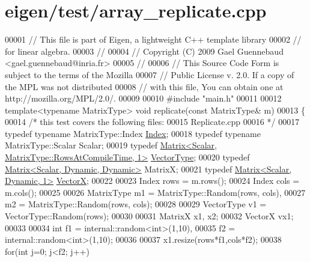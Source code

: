 \hypertarget{eigen_2test_2array__replicate_8cpp_source}{}\section{eigen/test/array\+\_\+replicate.cpp}
\label{eigen_2test_2array__replicate_8cpp_source}

\begin{DoxyCode}
00001 \textcolor{comment}{// This file is part of Eigen, a lightweight C++ template library}
00002 \textcolor{comment}{// for linear algebra.}
00003 \textcolor{comment}{//}
00004 \textcolor{comment}{// Copyright (C) 2009 Gael Guennebaud <gael.guennebaud@inria.fr>}
00005 \textcolor{comment}{//}
00006 \textcolor{comment}{// This Source Code Form is subject to the terms of the Mozilla}
00007 \textcolor{comment}{// Public License v. 2.0. If a copy of the MPL was not distributed}
00008 \textcolor{comment}{// with this file, You can obtain one at http://mozilla.org/MPL/2.0/.}
00009 
00010 \textcolor{preprocessor}{#include "main.h"}
00011 
00012 \textcolor{keyword}{template}<\textcolor{keyword}{typename} MatrixType> \textcolor{keywordtype}{void} replicate(\textcolor{keyword}{const} MatrixType& m)
00013 \{
00014   \textcolor{comment}{/* this test covers the following files:}
00015 \textcolor{comment}{     Replicate.cpp}
00016 \textcolor{comment}{  */}
00017   \textcolor{keyword}{typedef} \textcolor{keyword}{typename} MatrixType::Index \hyperlink{namespace_eigen_a62e77e0933482dafde8fe197d9a2cfde}{Index};
00018   \textcolor{keyword}{typedef} \textcolor{keyword}{typename} MatrixType::Scalar Scalar;
00019   \textcolor{keyword}{typedef} \hyperlink{group___core___module_class_eigen_1_1_matrix}{Matrix<Scalar, MatrixType::RowsAtCompileTime, 1>} 
      \hyperlink{struct_vector_type}{VectorType};
00020   \textcolor{keyword}{typedef} \hyperlink{group___core___module}{Matrix<Scalar, Dynamic, Dynamic>} MatrixX;
00021   \textcolor{keyword}{typedef} \hyperlink{group___core___module}{Matrix<Scalar, Dynamic, 1>} \hyperlink{group___core___module}{VectorX};
00022 
00023   Index rows = m.rows();
00024   Index cols = m.cols();
00025 
00026   MatrixType m1 = MatrixType::Random(rows, cols),
00027              m2 = MatrixType::Random(rows, cols);
00028 
00029   VectorType v1 = VectorType::Random(rows);
00030 
00031   MatrixX x1, x2;
00032   VectorX vx1;
00033 
00034   \textcolor{keywordtype}{int}  f1 = internal::random<int>(1,10),
00035        f2 = internal::random<int>(1,10);
00036 
00037   x1.resize(rows*f1,cols*f2);
00038   \textcolor{keywordflow}{for}(\textcolor{keywordtype}{int} j=0; j<f2; j++)

\end{DoxyCode}
